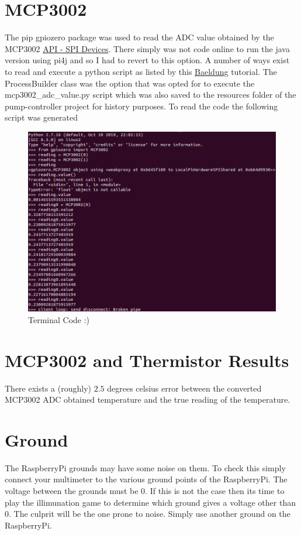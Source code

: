 \documentclass{article}
\begin{document}
	\section{MCP3002} %
	\label{sec:mcp3002}
	The pip gpiozero package was used to read the ADC value obtained by the MCP3002 \href{https://gpiozero.readthedocs.io/en/stable/api_spi.html}{API - SPI Devices}. There simply was not code online to run the java version using pi4j and so I had to revert to this option. A number of ways exist to read and execute a python script as listed by this \href{https://www.baeldung.com/java-working-with-python}{Baeldung} tutorial. The ProcessBuilder class was the option that was opted for to execute the mcp3002\_adc\_value.py script which was also saved to the resources folder of the pump-controller project for history purposes. To read the code the following script was generated 
	\begin{figure}[H]
	\centering
	\includegraphics[width=\textwidth]{images/mcp3002_gpiozero_code_read_adc.png}
	\caption{Terminal Code :)}	
	\end{figure}


	

	\section{MCP3002 and Thermistor Results}
	There exists a (roughly) $2.5$ degrees celsius error between the converted MCP3002 ADC obtained temperature and the true reading of the temperature.

	\section{Ground} %
	\label{sec:ground}
	The RaspberryPi grounds may have some noise on them. To check this simply connect your multimeter to the various ground points of the RaspberryPi. The voltage between the grounds must be 0. If this is not the case then its time to play the illimunation game to determine which ground gives a voltage other than 0. The culprit will be the one prone to noise. Simply use another ground on the RaspberryPi. 
	
\end{document}

